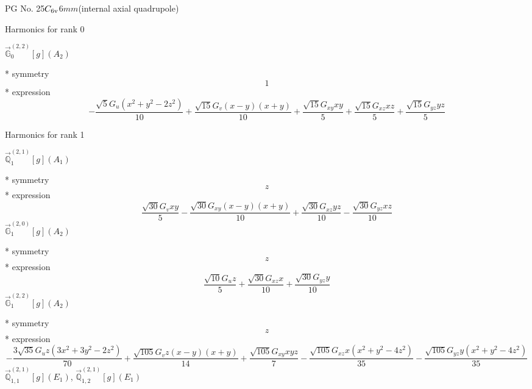 \documentclass[fleqn,8pt]{jsarticle}
\begin{document}
\setcounter{MaxMatrixCols}{32}

\renewcommand{\tablename}{Table~}
\renewcommand{\figurename}{Figure~}
\begin{center}
\LARGE
PG No. 25\quad$C_{\rm 6v}$\quad$6mm$\quad[ hexagonal ] (internal axial quadrupole)
\end{center}

\noindent * Harmonics for rank 0

\noindent\quad $\vec{\mathbb{G}}_{0}^{(2,2)}[g](A_{2})$

\noindent\quad ** symmetry
\begin{dmath*}
1
\end{dmath*}
\noindent\quad ** expression
\begin{dmath*}
- \frac{\sqrt{5} G_{u} \left(x^{2} + y^{2} - 2 z^{2}\right)}{10} + \frac{\sqrt{15} G_{v} \left(x - y\right) \left(x + y\right)}{10} + \frac{\sqrt{15} G_{xy} x y}{5} + \frac{\sqrt{15} G_{xz} x z}{5} + \frac{\sqrt{15} G_{yz} y z}{5}
\end{dmath*}

\noindent * Harmonics for rank 1

\noindent\quad $\vec{\mathbb{Q}}_{1}^{(2,1)}[g](A_{1})$

\noindent\quad ** symmetry
\begin{dmath*}
z
\end{dmath*}
\noindent\quad ** expression
\begin{dmath*}
\frac{\sqrt{30} G_{v} x y}{5} - \frac{\sqrt{30} G_{xy} \left(x - y\right) \left(x + y\right)}{10} + \frac{\sqrt{30} G_{xz} y z}{10} - \frac{\sqrt{30} G_{yz} x z}{10}
\end{dmath*}
\noindent\quad $\vec{\mathbb{G}}_{1}^{(2,0)}[g](A_{2})$

\noindent\quad ** symmetry
\begin{dmath*}
z
\end{dmath*}
\noindent\quad ** expression
\begin{dmath*}
\frac{\sqrt{10} G_{u} z}{5} + \frac{\sqrt{30} G_{xz} x}{10} + \frac{\sqrt{30} G_{yz} y}{10}
\end{dmath*}
\noindent\quad $\vec{\mathbb{G}}_{1}^{(2,2)}[g](A_{2})$

\noindent\quad ** symmetry
\begin{dmath*}
z
\end{dmath*}
\noindent\quad ** expression
\begin{dmath*}
- \frac{3 \sqrt{35} G_{u} z \left(3 x^{2} + 3 y^{2} - 2 z^{2}\right)}{70} + \frac{\sqrt{105} G_{v} z \left(x - y\right) \left(x + y\right)}{14} + \frac{\sqrt{105} G_{xy} x y z}{7} - \frac{\sqrt{105} G_{xz} x \left(x^{2} + y^{2} - 4 z^{2}\right)}{35} - \frac{\sqrt{105} G_{yz} y \left(x^{2} + y^{2} - 4 z^{2}\right)}{35}
\end{dmath*}
\noindent\quad $\vec{\mathbb{Q}}_{1,1}^{(2,1)}[g](E_{1})$, $\vec{\mathbb{Q}}_{1,2}^{(2,1)}[g](E_{1})$
\end{document}
